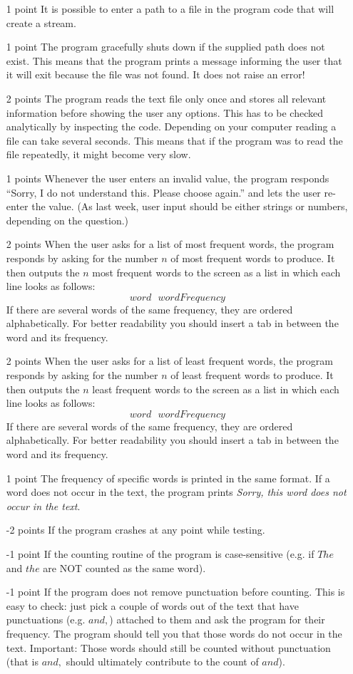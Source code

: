 \documentclass[11pt, leqno, a4paper]{article}
\begin{document}
\begin{itemize}
\item[1 point] It is possible to enter a path to a file in the program code that will create a stream.
\item[1 point] The program gracefully shuts down if the supplied path does not exist. This means that the program prints a message informing the user
that it will exit because the file was not found. It does not raise an error!
\item[2 points] The program reads the text file only once and stores all relevant information before showing the user any options. This has to
be checked analytically by inspecting the code. Depending on your computer reading a file can take several seconds. This means that if the program was to read the file repeatedly, it might become very slow.
\item[1 points] Whenever the user enters an invalid value, the program responds ``Sorry, I do not understand this. Please choose again.'' and lets the
user re-enter the value. (As last week, user input should be either strings or numbers, depending on the question.)
\item[2 points] When the user asks for a list of most frequent words, the program responds by asking for the number $ n $ of most frequent words to 
produce. It then outputs the $ n $ most frequent words to the screen as a list in which each line looks as follows:
$$ word~~~wordFrequency $$
If there are several words of the same frequency, they are ordered alphabetically. For better readability
you should insert a tab in between the word and its frequency.
\item[2 points] When the user asks for a list of least frequent words, the program responds by asking for the number $ n $ of least frequent words to 
produce. It then outputs the $ n $ least frequent words to the screen as a list in which each line looks as follows:
$$ word~~~wordFrequency $$
If there are several words of the same frequency, they are ordered alphabetically.  For better readability
you should insert a tab in between the word and its frequency.
\item[1 point] The frequency of specific words is printed in the same format. If a word does not occur in the text, the program prints \textit{Sorry, this
word does not occur in the text}.
\item[-2 points] If the program crashes at any point while testing.
\item[-1 point] If the counting routine of the program is case-sensitive (e.g. if $ The $ and $ the $ are NOT counted as the same word).
\item[-1 point] If the program does not remove punctuation before counting. This is easy to check: just
pick a couple of words out of the text that have punctuations (e.g. $ and, $) attached to them and ask the program for their frequency. The program should tell you that those words do not occur in the text. Important: Those words should still be counted without punctuation (that is $ and, $ should ultimately
contribute to the count of $ and $).
\end{itemize}
\end{document}
